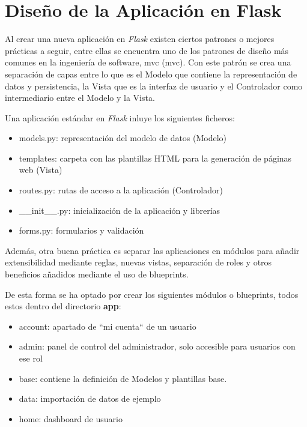 \documentclass[11pt,spanish,listoffigures,listoftables]{tfgetsinf}
\begin{document}
\section{Diseño de la Aplicación en Flask}

Al crear una nueva aplicación en \textit{Flask} existen ciertos patrones o mejores prácticas a seguir, entre ellas se encuentra uno de los patrones de diseño más comunes en la ingeniería de software, \acrlong{mvc} (\acrshort{mvc}). Con este patrón se crea una separación de capas entre lo que es el Modelo que contiene la representación de datos y persistencia, la Vista que es la interfaz de usuario y el Controlador como intermediario entre el Modelo y la Vista.

Una aplicación estándar en \textit{Flask} inluye los siguientes ficheros:

\begin{itemize}
	\item models.py: representación del modelo de datos (Modelo)
	\item templates: carpeta con las plantillas HTML para la generación de páginas web (Vista)
	\item routes.py: rutas de acceso a la aplicación (Controlador)
	\item \_\_init\_\_.py: inicialización de la aplicación y librerías
	\item forms.py: formularios y validación
\end{itemize}

Además, otra buena práctica es separar las aplicaciones en módulos para añadir extensibilidad mediante reglas, nuevas vistas, separación de roles y otros beneficios añadidos mediante el uso de \foreignlanguage{english}{blueprints}.

De esta forma se ha optado por crear los siguientes módulos o \foreignlanguage{english}{blueprints}, todos estos dentro del directorio \textbf{app}:

\begin{itemize}
	\item account: apartado de ``mi cuenta`` de un usuario
	\item admin: panel de control del administrador, solo accesible para usuarios con ese rol
	\item base: contiene la definición de Modelos y plantillas base.
	\item data: importación de datos de ejemplo
	\item home: \foreignlanguage{english}{dashboard} de usuario
\end{itemize}
\end{document}
